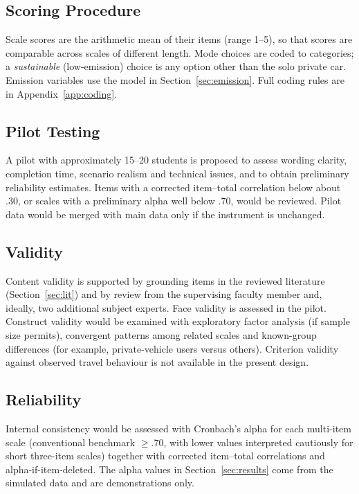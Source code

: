 \documentclass[11pt,a4paper]{article}
\begin{document}
\subsection{Scoring Procedure}
Scale scores are the arithmetic mean of their items (range 1--5), so that scores are comparable
across scales of different length. Mode choices are coded to categories; a \emph{sustainable}
(low-emission) choice is any option other than the solo private car. Emission variables use the model
in Section~\ref{sec:emission}. Full coding rules are in Appendix~\ref{app:coding}.

\subsection{Pilot Testing}
A pilot with approximately 15--20 students is proposed to assess wording clarity, completion time,
scenario realism and technical issues, and to obtain preliminary reliability estimates. Items with a
corrected item--total correlation below about $.30$, or scales with a preliminary alpha well below
$.70$, would be reviewed. Pilot data would be merged with main data only if the instrument is
unchanged.

\subsection{Validity}
Content validity is supported by grounding items in the reviewed literature
(Section~\ref{sec:lit}) and by review from the supervising faculty member and, ideally, two
additional subject experts. Face validity is assessed in the pilot. Construct validity would be
examined with exploratory factor analysis (if sample size permits), convergent patterns among related
scales and known-group differences (for example, private-vehicle users versus others). Criterion
validity against observed travel behaviour is not available in the present design.

\subsection{Reliability}
Internal consistency would be assessed with Cronbach's alpha for each multi-item scale (conventional
benchmark $\geq .70$, with lower values interpreted cautiously for short three-item scales) together
with corrected item--total correlations and alpha-if-item-deleted. The alpha values in
Section~\ref{sec:results} come from the simulated data and are demonstrations only.
\end{document}
